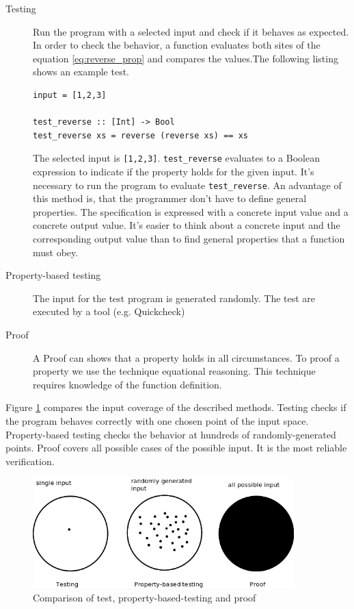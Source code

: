 \begin{description}
\item[Testing] Run the program with a selected input and check if it behaves as expected. In order to check the behavior, a function evaluates both sites of the equation \ref{eq:reverse_prop} and compares the values.The following listing shows an example test.

\begin{lstlisting}[caption={function defintion for testing},label={lst:testing}]
input = [1,2,3]

test_reverse :: [Int] -> Bool
test_reverse xs = reverse (reverse xs) == xs
\end{lstlisting}

The selected input is \verb|[1,2,3]|. \verb|test_reverse| evaluates to a Boolean expression to indicate if the property holds for the given input. It's necessary to run the program to evaluate \verb|test_reverse|.
An advantage of this method is, that the programmer don't have to define general properties. The specification is expressed with a concrete input value and a concrete output value. It's easier to think about a concrete input and the corresponding output value than to find general properties that a function must obey.
\item[Property-based testing] The input for the test program is generated randomly. The test are executed by a tool (e.g. Quickcheck)
\item[Proof] A Proof can shows that a property holds in all circumstances. To proof a property we use the technique equational reasoning. This technique requires knowledge of the function definition.
\end{description}

Figure \ref{fig:property_validation} compares the input coverage of the described methods. Testing checks if the program behaves correctly with one chosen point of the input space. Property-based testing checks the behavior at hundreds of randomly-generated points. Proof covers all possible cases of the possible input. It is the most reliable verification.

\begin{figure}
  \centering
     \includegraphics[width=0.9\textwidth]{testing}
  \caption{Comparison of test, property-based-testing and proof}
  \label{fig:property_validation}
\end{figure}

